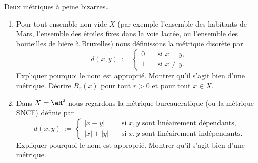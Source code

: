 
\begin{exercice}\label{exo0081}

Deux métriques à peine bizarres\ldots

\begin{enumerate}
\item
 Pour tout ensemble non vide $X$ (par exemple l'ensemble des habitants de Mars, l'ensemble des étoiles fixes dans la voie lactée, ou l'ensemble des bouteilles de bière à Bruxelles) nous définissons la \og métrique discrète\fg{}  par
\begin{equation*}
d(x,y) \,:=\,
\left\{
\begin{array}{cl} 
0 \quad &\text{si } x=y,  \\[.2em]
1 \quad &\text{si } x \neq y. 
\end{array} 
\right.
\end{equation*}
Expliquer pourquoi le nom est approprié. Montrer qu'il s'agit bien d'une métrique.
Décrire $B_r(x)$ pour tout $r>0$ et pour tout $x \in X$.

\item 
Dans $X = \eR^2$ nous regardons la \og métrique bureaucratique\fg{} (ou la \og métrique SNCF\fg)
définie par
\begin{equation*}
d(x,y) \,:=\,
\left\{
\begin{array}{ll} 
|x-y| \quad 
  &\text{si } x, y \text{ sont linéairement dépendants},  \\[.2em]
|x|+|y| \quad 
  &\text{si } x, y \text{ sont linéairement indépendants}.
\end{array} \right.
\end{equation*}
Expliquer pourquoi le nom est approprié. Montrer qu'il s'agit bien d'une métrique.
\end{enumerate}


\end{exercice}
